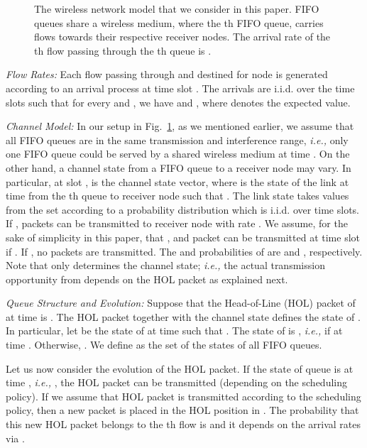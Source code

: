 \documentclass[conference]{IEEEtran}
\newcommand{\ie}{{\em i.e., }}
\begin{document}
\begin{figure}
\vspace{5pt}
\centering
{}
\vspace{-5pt}
\caption{The wireless network model that we consider in this paper.  FIFO queues share a wireless medium, where the th FIFO queue,   carries  flows towards their respective receiver nodes. The arrival rate of the th flow passing through the th queue is .}
\label{fig:main-example}
\vspace{-15pt}
\end{figure}

{\em Flow Rates:}  Each flow passing through  and destined for node  is generated according to an arrival process  at time slot . The arrivals are i.i.d. over the time slots such that for every  and , we have  and , where  denotes the expected value.

{\em Channel Model:} In our setup in Fig.~\ref{fig:main-example}, as we mentioned earlier, we assume that all FIFO queues are in the same transmission and interference range, \ie only one FIFO queue could be served by a shared wireless medium at time . On the other hand, a channel state from a FIFO queue to a receiver node may vary. In particular, at slot ,  is the channel state vector, where  is the state of the link at time  from the th queue  to receiver node  such that .  The link state  takes values from the set  according to a probability distribution which is i.i.d. over time slots. If , packets can be transmitted to receiver node  with rate . We assume, for the sake of simplicity in this paper, that , and  packet can be transmitted at time slot  if . If , no packets are transmitted. The  and  probabilities of  are  and , respectively. Note that  only determines the channel state; \ie the actual transmission opportunity from  depends on the HOL packet as explained next.


{\em Queue Structure and Evolution:}  Suppose that the Head-of-Line (HOL) packet of  at time  is . The HOL packet together with the channel state defines the state of . In particular, let  be the state of  at time  such that . The state of  is , \ie  if  at time . Otherwise, . We define            as the set of the states of all FIFO queues.

Let us now consider the evolution of the HOL packet. If the state of queue  is  at time , \ie , the HOL packet can be transmitted (depending on the scheduling policy). If we assume that HOL packet is transmitted according to the scheduling policy, then a new packet is placed in the HOL position in . The probability that this new HOL packet belongs to the th flow is  and it depends on the arrival rates via .
\end{document}
